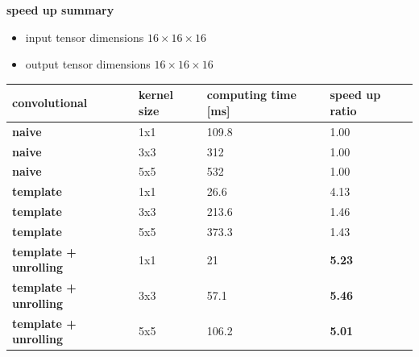 \documentclass[xcolor=dvipsnames]{beamer}
\begin{document}
\begin{frame}{\bf speed up summary}

\begin{itemize}
  \item input tensor dimensions $16 \times 16 \times 16$
  \item output tensor dimensions $16 \times 16 \times 16$
\end{itemize}

\begin{table}[]
  \footnotesize
  \begin{tabular}{|l|l|l|l|}
  \hline
  \textbf{convolutional}                               & \textbf{kernel size} & \textbf{computing time {[}ms{]}} & \textbf{speed up ratio} \\ \hline
  {\color[HTML]{67FD9A} \textbf{naive}}                & 1x1                  & 109.8                            & 1.00                    \\ \hline
  {\color[HTML]{67FD9A} \textbf{naive}}                & 3x3                  & 312                              & 1.00                    \\ \hline
  {\color[HTML]{67FD9A} \textbf{naive}}                & 5x5                  & 532                              & 1.00                    \\ \hline
  {\color[HTML]{34CDF9} \textbf{template}}             & 1x1                  & 26.6                             & 4.13                    \\ \hline
  {\color[HTML]{34CDF9} \textbf{template}}             & 3x3                  & 213.6                            & 1.46                    \\ \hline
  {\color[HTML]{34CDF9} \textbf{template}}             & 5x5                  & 373.3                            & 1.43                    \\ \hline
  {\color[HTML]{FD6864} \textbf{template + unrolling}} & 1x1                  & 21                               & \textbf{5.23}           \\ \hline
  {\color[HTML]{FD6864} \textbf{template + unrolling}} & 3x3                  & 57.1                             & \textbf{5.46}           \\ \hline
  {\color[HTML]{FD6864} \textbf{template + unrolling}} & 5x5                  & 106.2                            & \textbf{5.01}           \\ \hline
  \end{tabular}
\end{table}

\end{frame}
\end{document}
